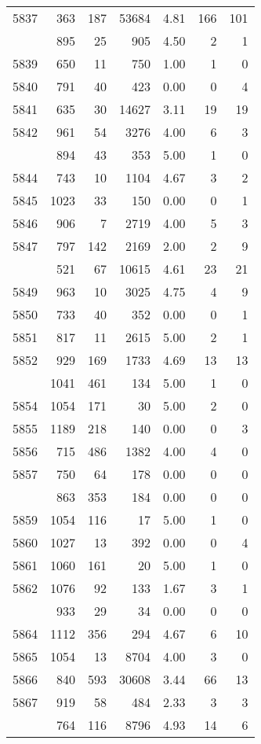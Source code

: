 \documentclass[
]{article}
\begin{document}
\begin{table}
\begin{tabular}[t]{lrrrrrr}
5837 & 363 & 187 & 53684 & 4.81 & 166 & 101\\
\addlinespace
5838 & 895 & 25 & 905 & 4.50 & 2 & 1\\
5839 & 650 & 11 & 750 & 1.00 & 1 & 0\\
5840 & 791 & 40 & 423 & 0.00 & 0 & 4\\
5841 & 635 & 30 & 14627 & 3.11 & 19 & 19\\
5842 & 961 & 54 & 3276 & 4.00 & 6 & 3\\
\addlinespace
5843 & 894 & 43 & 353 & 5.00 & 1 & 0\\
5844 & 743 & 10 & 1104 & 4.67 & 3 & 2\\
5845 & 1023 & 33 & 150 & 0.00 & 0 & 1\\
5846 & 906 & 7 & 2719 & 4.00 & 5 & 3\\
5847 & 797 & 142 & 2169 & 2.00 & 2 & 9\\
\addlinespace
5848 & 521 & 67 & 10615 & 4.61 & 23 & 21\\
5849 & 963 & 10 & 3025 & 4.75 & 4 & 9\\
5850 & 733 & 40 & 352 & 0.00 & 0 & 1\\
5851 & 817 & 11 & 2615 & 5.00 & 2 & 1\\
5852 & 929 & 169 & 1733 & 4.69 & 13 & 13\\
\addlinespace
5853 & 1041 & 461 & 134 & 5.00 & 1 & 0\\
5854 & 1054 & 171 & 30 & 5.00 & 2 & 0\\
5855 & 1189 & 218 & 140 & 0.00 & 0 & 3\\
5856 & 715 & 486 & 1382 & 4.00 & 4 & 0\\
5857 & 750 & 64 & 178 & 0.00 & 0 & 0\\
\addlinespace
5858 & 863 & 353 & 184 & 0.00 & 0 & 0\\
5859 & 1054 & 116 & 17 & 5.00 & 1 & 0\\
5860 & 1027 & 13 & 392 & 0.00 & 0 & 4\\
5861 & 1060 & 161 & 20 & 5.00 & 1 & 0\\
5862 & 1076 & 92 & 133 & 1.67 & 3 & 1\\
\addlinespace
5863 & 933 & 29 & 34 & 0.00 & 0 & 0\\
5864 & 1112 & 356 & 294 & 4.67 & 6 & 10\\
5865 & 1054 & 13 & 8704 & 4.00 & 3 & 0\\
5866 & 840 & 593 & 30608 & 3.44 & 66 & 13\\
5867 & 919 & 58 & 484 & 2.33 & 3 & 3\\
\addlinespace
5868 & 764 & 116 & 8796 & 4.93 & 14 & 6\\

\end{tabular}
\end{table}
\end{document}
